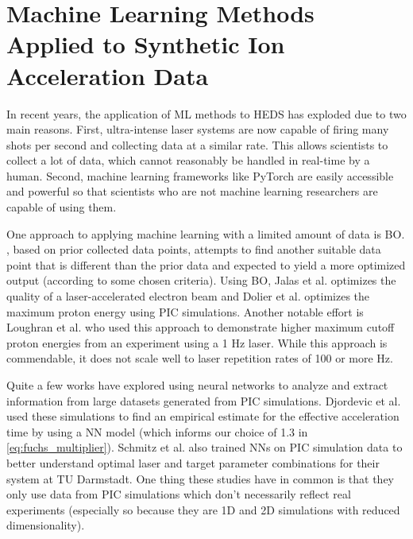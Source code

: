 \chapter{Machine Learning Methods Applied to Synthetic Ion Acceleration Data} \label{ch:5}

In recent years, the application of \gls{ML} methods to \gls{HEDS} has exploded due to two main reasons. First, ultra-intense laser systems are now capable of firing many shots per second and collecting data at a similar rate. This allows scientists to collect a lot of data, which cannot reasonably be handled in real-time by a human. Second, machine learning frameworks like PyTorch \cite{PyTorch_2019} are easily accessible and powerful so that scientists who are not machine learning researchers are capable of using them.

One approach to applying machine learning with a limited amount of data is \gls{BO}. , based on prior collected data points, attempts to find another suitable data point that is different than the prior data and expected to yield a more optimized output (according to some chosen criteria). Using \gls{BO}, Jalas et al. \cite{Jalas_2021_PRL} optimizes the quality of a laser-accelerated electron beam and Dolier et al. \cite{Dolier_2022_NJoP} optimizes the maximum proton energy using PIC simulations. Another notable effort is Loughran et al. \cite{Loughran_2023_HPLSE} who used this approach to demonstrate higher maximum cutoff proton energies from an experiment using a 1 Hz laser. While this approach is commendable, it does not scale well to laser repetition rates of 100 or more Hz. 

Quite a few works have explored using neural networks to analyze and extract information from large datasets generated from \gls{PIC} simulations. Djordevic et al. \cite{Djordjevic_2021_PPCF} used these simulations to find an empirical estimate for the effective acceleration time by using a \gls{NN} model (which informs our choice of 1.3 in \autoref{eq:fuchs_multiplier}). Schmitz et al. \cite{Schmitz_2023_LaPB} also trained \gls{NN}s on \gls{PIC} simulation data to better understand optimal laser and target parameter combinations for their system at TU Darmstadt. One thing these studies have in common is that they only use data from \gls{PIC} simulations which don't necessarily reflect real experiments (especially so because they are 1D and 2D simulations with reduced dimensionality). 

